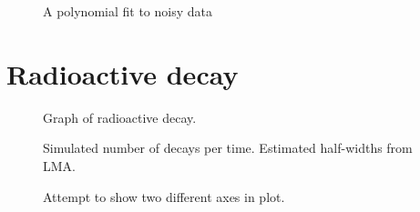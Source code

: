 \documentclass{article}
\begin{document}
\begin{figure}[H]
  \centering
  
  \caption{A polynomial fit to noisy data}
\end{figure}

\section{Radioactive decay}
\label{sec:decay}

\begin{figure}[H]
  \centering
  
  \caption{Graph of radioactive decay.}
\end{figure}

\begin{figure}[H]
  \centering
  
  \caption{Simulated number of decays per time.  Estimated half-widths from LMA.}
\end{figure}

\begin{figure}[H]
  \centering
  
  \caption{ Attempt to show two different axes in plot. }
\end{figure}
\end{document}
